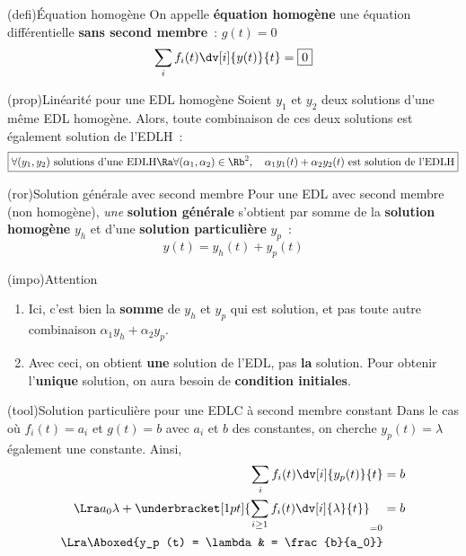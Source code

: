 \documentclass[a4paper, 12pt, garamond]{book}
\begin{document}
\begin{tcb}(defi){Équation homogène}
	On appelle \textbf{équation homogène} une équation différentielle \textbf{sans
		second membre}~: $g(t) = 0$
	\[
		\sum_{i} f_i(t) \dv[i]{y(t)}{t} = \fbox{0}
	\]
\end{tcb}

\begin{tcb*}[label=prop:lin](prop){Linéarité pour une EDL homogène}
	Soient $y_1$ et $y_2$ deux solutions d'une même EDL homogène. Alors, toute combinaison de ces deux solutions est également
	solution de l'EDLH~:
	\[
		\boxed{
			\forall (y_1,y_2)
			\text{~solutions d'une EDLH}
			\Ra
			\forall (\alpha_1,\alpha_2) \in \Rb^{2},
			\quad \alpha_1 y_1(t) + \alpha_2 y_2(t)
			\text{~est solution de l'EDLH}
		}
	\]
\end{tcb*}

\begin{tcb}(ror){Solution générale avec second membre}
	Pour une EDL avec second membre (non homogène), \textit{une} \textbf{solution
		générale} s'obtient par somme de la \textbf{solution homogène} $y_h$ et d'une
	\textbf{solution particulière} $y_p$~:
	\[
		\boxed{y(t) = y_h(t) + y_p(t)}
	\]
\end{tcb}

\begin{tcb}(impo){Attention}
	\begin{enumerate}
		\item Ici, c'est bien la \textbf{somme} de $y_h$ et $y_p$ qui est solution,
		      et pas toute autre combinaison $\alpha_1 y_h + \alpha_2 y_p$.
		\item Avec ceci, on obtient \textbf{une} solution de l'EDL, pas \textbf{la}
		      solution. Pour obtenir l'\textbf{unique} solution, on aura besoin de
		      \textbf{condition initiales}.
	\end{enumerate}
\end{tcb}

\begin{tcb}(tool){Solution particulière pour une EDLC à second membre
			constant}
	Dans le cas où $f_i(t) = a_i$ et $g(t) = b$ avec $a_i$ et $b$ des
	constantes, on cherche $y_p (t) = \lambda$ également une constante. Ainsi,
	\begin{align*}
		\sum_{i} f_i(t) \dv[i]{y_p(t)}{t} & = b
		\\\Lra
		a_0 \lambda +
		\underbracket[1pt]{
			\sum_{i \geq 1} f_i(t) \dv[i]{\lambda}{t}
		}_{ =0}                           & = b
		\\\Lra
		\Aboxed{y_p (t) = \lambda         & = \frac{b}{a_0}}
	\end{align*}
\end{tcb}
\end{document}
